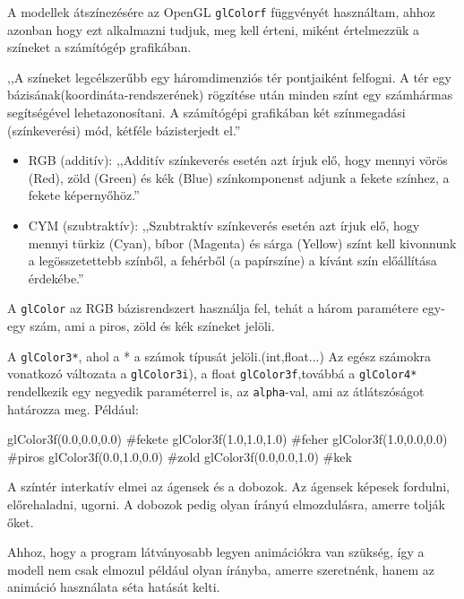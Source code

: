 
A modellek átszínezésére az OpenGL \texttt{glColorf} függvényét használtam, ahhoz azonban hogy ezt alkalmazni tudjuk, meg kell érteni, miként értelmezzük a színeket a számítógép grafikában.

,,A színeket legcélszerűbb egy háromdimenziós tér pontjaiként felfogni. A tér egy bázisának(koordináta-rendszerének) rögzítése után minden színt egy számhármas segítségével lehetazonosítani. A számítógépi grafikában két színmegadási (színkeverési) mód, kétféle bázisterjedt el.”
\begin{itemize}
\item  RGB (additív): ,,Additív színkeverés esetén azt írjuk elő, hogy mennyi vörös (Red), zöld (Green) és kék (Blue) színkomponenst adjunk a fekete színhez, a fekete képernyőhöz.”
\item CYM (szubtraktív): ,,Szubtraktív színkeverés esetén azt írjuk elő, hogy mennyi türkiz (Cyan), bíbor (Magenta) és sárga (Yellow) színt kell kivonnunk a legösszetettebb színből, a fehérből (a papírszíne) a kívánt szín előállítása érdekébe.”\cite{fenyek_szinek}
\end{itemize}

A \texttt{glColor} az RGB bázisrendszert használja fel, tehát a három paramétere egy-egy szám, ami a piros, zöld és kék színeket jelöli.

A \texttt{glColor3*}, ahol a * a számok típusát jelöli.(int,float...) Az egész számokra vonatkozó változata a \texttt{glColor3i}), a float \texttt{glColor3f},továbbá a \texttt{glColor4*} rendelkezik egy negyedik paraméterrel is, az \texttt{alpha}-val, ami az átlátszóságot határozza meg.
Például: 
\begin{python}
glColor3f(0.0,0.0,0.0) #fekete
glColor3f(1.0,1.0,1.0) #feher
glColor3f(1.0,0.0,0.0) #piros
glColor3f(0.0,1.0,0.0) #zold
glColor3f(0.0,0.0,1.0) #kek
\end{python}


A színtér interkatív elmei az ágensek és a dobozok. 
Az ágensek képesek fordulni, előrehaladni, ugorni. 
A dobozok pedig olyan írányú elmozdulásra, amerre tolják őket.


Ahhoz, hogy a program látványosabb legyen animációkra van szükség, így a modell nem csak elmozul például olyan írányba, amerre szeretnénk, hanem az animáció használata séta hatását kelti.

